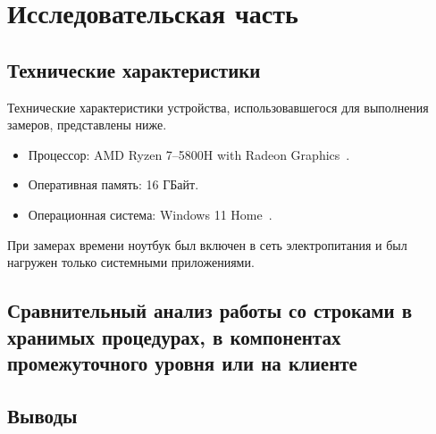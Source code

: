 \chapter{Исследовательская часть}


\section{Технические характеристики}

Технические характеристики устройства, использовавшегося для выполнения замеров, представлены ниже.

\begin{itemize}[label=---]
	\item Процессор: AMD Ryzen 7--5800H with Radeon Graphics~\cite{amd_ryzen}.
	\item Оперативная память: 16 ГБайт.
	\item Операционная система: Windows 11 Home~\cite{windows}.
\end{itemize}

При замерах времени ноутбук был включен в сеть электропитания и был нагружен только системными приложениями.

\section{Сравнительный анализ работы со строками в хранимых процедурах, в компонентах промежуточного уровня или на клиенте}
\section*{Выводы}

